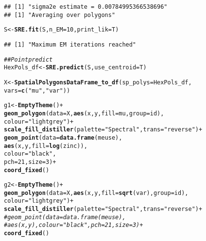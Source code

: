 \documentclass{article}\usepackage[]{graphicx}\usepackage[]{color}
\makeatletter
\newcommand{\hlnum}[1]{\textcolor[rgb]{0.686,0.059,0.569}{#1}}%
\newcommand{\hlstr}[1]{\textcolor[rgb]{0.192,0.494,0.8}{#1}}%
\newcommand{\hlcom}[1]{\textcolor[rgb]{0.678,0.584,0.686}{\textit{#1}}}%
\newcommand{\hlopt}[1]{\textcolor[rgb]{0,0,0}{#1}}%
\newcommand{\hlstd}[1]{\textcolor[rgb]{0.345,0.345,0.345}{#1}}%
\newcommand{\hlkwb}[1]{\textcolor[rgb]{0.69,0.353,0.396}{#1}}%
\newcommand{\hlkwc}[1]{\textcolor[rgb]{0.333,0.667,0.333}{#1}}%
\newcommand{\hlkwd}[1]{\textcolor[rgb]{0.737,0.353,0.396}{\textbf{#1}}}%
\newenvironment{kframe}{%
 \def\at@end@of@kframe{}%
 \ifinner\ifhmode%
  \def\at@end@of@kframe{\end{minipage}}%
  \begin{minipage}{\columnwidth}%
 \fi\fi%
 \def\FrameCommand##1{\hskip\@totalleftmargin \hskip-\fboxsep
 \colorbox{shadecolor}{##1}\hskip-\fboxsep
     \hskip-\linewidth \hskip-\@totalleftmargin \hskip\columnwidth}%
 \MakeFramed {\advance\hsize-\width
   \@totalleftmargin\z@ \linewidth\hsize
   \@setminipage}}%
 {\par\unskip\endMakeFramed%
 \at@end@of@kframe}
\newenvironment{knitrout}{}{} %
\makeatother
\begin{document}
\begin{knitrout}
\begin{kframe}
{\ttfamily\noindent\color{warningcolor}{\#\# Warning in map\_data\_to\_BAUs(data[[i]], BAUs, av\_var = av\_var, variogram.formula = f, : Not accounting for multiple data in the same grid box during variogram estimation. Need to see how to do this with gstat}}\begin{verbatim}
## [1] "sigma2e estimate = 0.00784995366538696"
## [1] "Averaging over polygons"
\end{verbatim}
\begin{alltt}
\hlstd{S} \hlkwb{<-} \hlkwd{SRE.fit}\hlstd{(S,}\hlkwc{n_EM} \hlstd{=} \hlnum{10}\hlstd{,}\hlkwc{print_lik}\hlstd{=T)}
\end{alltt}
\begin{verbatim}
## [1] "Maximum EM iterations reached"
\end{verbatim}


{\ttfamily\noindent\color{warningcolor}{\#\# Warning in SRE.fit(S, n\_EM = 10, print\_lik = T): Ignoring constants in log-likelihood computation}}\begin{alltt}
\hlcom{## Point predict}
\hlstd{HexPols_df} \hlkwb{<-} \hlkwd{SRE.predict}\hlstd{(S,}\hlkwc{use_centroid} \hlstd{= T)}

\hlstd{X} \hlkwb{<-} \hlkwd{SpatialPolygonsDataFrame_to_df}\hlstd{(}\hlkwc{sp_polys} \hlstd{= HexPols_df,}
                                    \hlkwc{vars} \hlstd{=} \hlkwd{c}\hlstd{(}\hlstr{"mu"}\hlstd{,}\hlstr{"var"}\hlstd{))}
\end{alltt}


{\ttfamily\noindent\itshape{}}\begin{alltt}
\hlstd{g1} \hlkwb{<-} \hlkwd{EmptyTheme}\hlstd{()} \hlopt{+}
    \hlkwd{geom_polygon}\hlstd{(}\hlkwc{data}\hlstd{=X,}\hlkwd{aes}\hlstd{(x,y,}\hlkwc{fill}\hlstd{=mu,}\hlkwc{group}\hlstd{=id),}
                 \hlkwc{colour}\hlstd{=}\hlstr{"light grey"}\hlstd{)} \hlopt{+}
    \hlkwd{scale_fill_distiller}\hlstd{(}\hlkwc{palette}\hlstd{=}\hlstr{"Spectral"}\hlstd{,}\hlkwc{trans}\hlstd{=}\hlstr{"reverse"}\hlstd{)} \hlopt{+}
    \hlkwd{geom_point}\hlstd{(}\hlkwc{data}\hlstd{=}\hlkwd{data.frame}\hlstd{(meuse),}
               \hlkwd{aes}\hlstd{(x,y,}\hlkwc{fill}\hlstd{=}\hlkwd{log}\hlstd{(zinc)),}
               \hlkwc{colour}\hlstd{=}\hlstr{"black"}\hlstd{,}
               \hlkwc{pch}\hlstd{=}\hlnum{21}\hlstd{,} \hlkwc{size}\hlstd{=}\hlnum{3}\hlstd{)} \hlopt{+}
    \hlkwd{coord_fixed}\hlstd{()}

\hlstd{g2} \hlkwb{<-} \hlkwd{EmptyTheme}\hlstd{()} \hlopt{+}
    \hlkwd{geom_polygon}\hlstd{(}\hlkwc{data}\hlstd{=X,}\hlkwd{aes}\hlstd{(x,y,}\hlkwc{fill}\hlstd{=}\hlkwd{sqrt}\hlstd{(var),}\hlkwc{group}\hlstd{=id),}
                 \hlkwc{colour}\hlstd{=}\hlstr{"light grey"}\hlstd{)} \hlopt{+}
    \hlkwd{scale_fill_distiller}\hlstd{(}\hlkwc{palette}\hlstd{=}\hlstr{"Spectral"}\hlstd{,}\hlkwc{trans}\hlstd{=}\hlstr{"reverse"}\hlstd{)} \hlopt{+}
    \hlcom{#geom_point(data=data.frame(meuse),}
    \hlcom{#           aes(x,y),colour="black",pch=21, size=3) +}
    \hlkwd{coord_fixed}\hlstd{()}


\end{alltt}
\end{kframe}
\end{knitrout}
\end{document}
